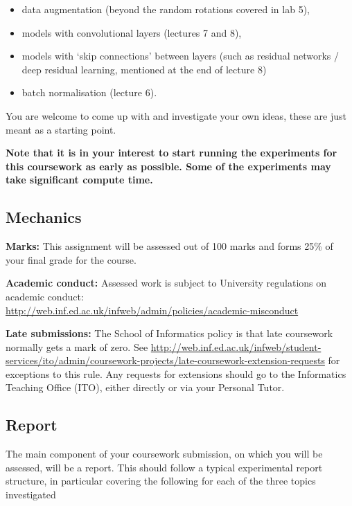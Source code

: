 \documentclass[11pt,]{article}
\begin{document}
\begin{itemize}
\itemsep1pt\parskip0pt
\item
  data augmentation (beyond the random rotations covered in lab 5),
\item
  models with convolutional layers (lectures 7 and 8),
\item
  models with `skip connections' between layers (such as residual
  networks / deep residual learning, mentioned at the end of lecture 8)
\item
  batch normalisation (lecture 6).
\end{itemize}

You are welcome to come up with and investigate your own ideas, these
are just meant as a starting point.

\textbf{Note that it is in your interest to start running the
experiments for this coursework as early as possible. Some of the
experiments may take significant compute time.}

\subsection{Mechanics}\label{mechanics}

\textbf{Marks:} This assignment will be assessed out of 100 marks and
forms 25\% of your final grade for the course.

\textbf{Academic conduct:} Assessed work is subject to University
regulations on academic
conduct:\\\url{http://web.inf.ed.ac.uk/infweb/admin/policies/academic-misconduct}

\textbf{Late submissions:} The School of Informatics policy is that late
coursework normally gets a mark of zero. See
{\small\url{http://web.inf.ed.ac.uk/infweb/student-services/ito/admin/coursework-projects/late-coursework-extension-requests}}
for exceptions to this rule. Any requests for extensions should go to
the Informatics Teaching Office (ITO), either directly or via your
Personal Tutor.

\subsection{Report}\label{report}

The main component of your coursework submission, on which you will be
assessed, will be a report. This should follow a typical experimental
report structure, in particular covering the following for each of the
three topics investigated
\end{document}
